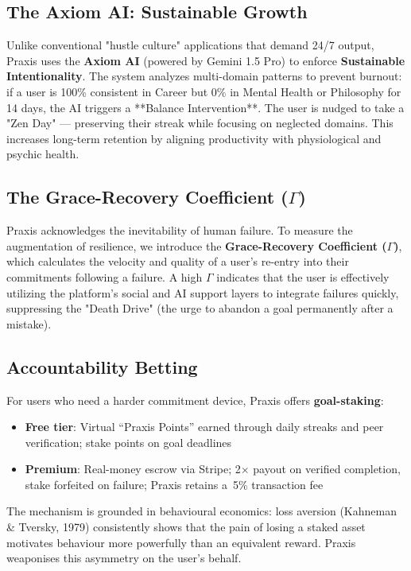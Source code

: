 \documentclass[11pt,a4paper]{article}
\begin{document}
\subsection{The Axiom AI: Sustainable Growth}

Unlike conventional "hustle culture" applications that demand 24/7 output, Praxis uses the \textbf{Axiom AI} (powered by Gemini 1.5 Pro) to enforce \textbf{Sustainable Intentionality}. The system analyzes multi-domain patterns to prevent burnout: if a user is 100\% consistent in Career but 0\% in Mental Health or Philosophy for 14 days, the AI triggers a **Balance Intervention**. The user is nudged to take a "Zen Day" — preserving their streak while focusing on neglected domains. This increases long-term retention by aligning productivity with physiological and psychic health.

\subsection{The Grace-Recovery Coefficient ($\Gamma$)}

Praxis acknowledges the inevitability of human failure. To measure the augmentation of resilience, we introduce the \textbf{Grace-Recovery Coefficient ($\Gamma$)}, which calculates the velocity and quality of a user's re-entry into their commitments following a failure. A high $\Gamma$ indicates that the user is effectively utilizing the platform's social and AI support layers to integrate failures quickly, suppressing the "Death Drive" (the urge to abandon a goal permanently after a mistake).

\subsection{Accountability Betting}

For users who need a harder commitment device, Praxis offers \textbf{goal-staking}:

\begin{itemize}
  \item \textbf{Free tier}: Virtual ``Praxis Points'' earned through daily streaks and peer verification; stake points on goal deadlines
  \item \textbf{Premium}: Real-money escrow via Stripe; 2$\times$ payout on verified completion, stake forfeited on failure; Praxis retains a~5\% transaction fee
\end{itemize}

The mechanism is grounded in behavioural economics: loss aversion (Kahneman \& Tversky, 1979) consistently shows that the pain of losing a staked asset motivates behaviour more powerfully than an equivalent reward. Praxis weaponises this asymmetry on the user's behalf.
\end{document}
